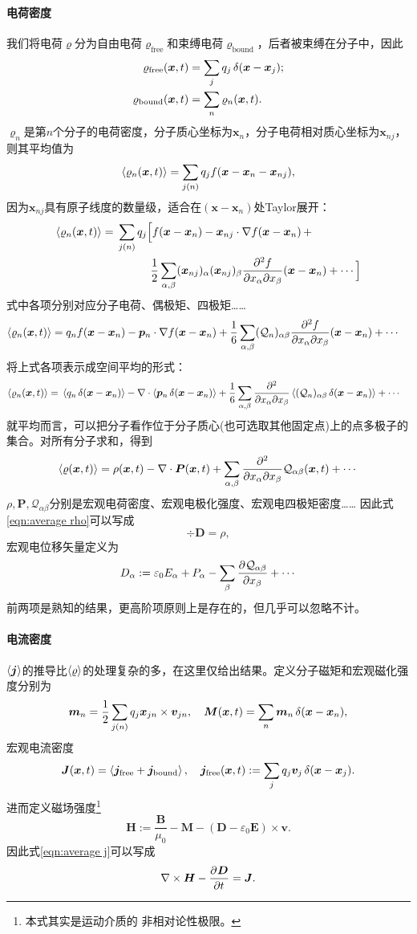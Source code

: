 \paragraph{电荷密度}
我们将电荷$\varrho$分为自由电荷$\varrho_\text{free}$和束缚电荷$\varrho_\text{bound}$，后者被束缚在分子中，因此
\begin{align*}
    \varrho_\text{free}(\bm x,t)&=\sum_jq_j\mathop{}\!\delta(\bm x-\bm x_j);\\
    \varrho_\text{bound}(\bm x,t)&=\sum_n\varrho_n(\bm x,t).
\end{align*}
$\varrho_n$是第$n$个分子的电荷密度，分子质心坐标为$\bm x_n$，分子电荷相对质心坐标为$\bm x_{nj}$，则其平均值为
\[
    \left\langle \varrho_n(\bm x,t)\right\rangle=\sum_{j(n)}q_jf(\bm x-\bm x_n-\bm x_{nj}),
\]
因为$\bm x_{nj}$具有原子线度的数量级，适合在$(\bm x-\bm x_n)$处Taylor展开： 
\begin{align*}
    \left\langle \varrho_n(\bm x,t)\right\rangle={}&\sum_{j(n)}q_j\Big[f(\bm x-\bm x_n)-\bm x_{nj}\cdot\nabla f(\bm x-\bm x_n)\,+\\
    &\qquad\quad\frac12\sum_{\alpha,\beta}(\bm x_{nj})_\alpha(\bm x_{nj})_\beta\frac{\partial^2{f}}{\partial{x_\alpha}\partial{x_\beta}}(\bm x-\bm x_n)+\cdots\Big]
\end{align*}
式中各项分别对应分子电荷、偶极矩、四极矩……
\begin{align*}
    \left\langle \varrho_n(\bm x,t)\right\rangle={}&q_nf(\bm x-\bm x_n)-\bm p_n\cdot\nabla f(\bm x-\bm x_n)+\frac16\sum_{\alpha,\beta}(\mathcal Q_n)_{\alpha\beta}\frac{\partial^2{f}}{\partial{x_\alpha}\partial{x_\beta}}(\bm x-\bm x_n)+\cdots
\end{align*}
将上式各项表示成空间平均的形式：
\begin{align*}
    \left\langle \varrho_n(\bm x,t)\right\rangle={}&\left\langle q_n\mathop{}\!\delta(\bm x-\bm x_n)\right\rangle-\nabla\cdot\left\langle \bm p_n\mathop{}\!\delta(\bm x-\bm x_n)\right\rangle+\frac16\sum_{\alpha,\beta}\frac{\partial^2{}}{\partial{x_\alpha}\partial{x_\beta}}\left\langle (\mathcal Q_n)_{\alpha\beta}\mathop{}\!\delta(\bm x-\bm x_n)\right\rangle+\cdots
\end{align*}
就平均而言，可以把分子看作位于分子质心(也可选取其他固定点)上的点多极子的集合。对所有分子求和，得到
\[
    \left\langle \varrho(\bm x,t)\right\rangle=\rho(\bm x,t)-\nabla\cdot\bm P(\bm x,t)+\sum_{\alpha,\beta}\frac{\partial^2{}}{\partial{x_\alpha}\partial{x_\beta}}\mathcal Q_{\alpha\beta}(\bm x,t)+\cdots
\]
$\rho,\bm P,\mathcal Q_{\alpha\beta}$分别是宏观电荷密度、宏观电极化强度、宏观电四极矩密度……
因此式\eqref{eqn:average rho}可以写成 
\[
    \div\bm D=\rho,
\]
宏观电位移矢量定义为
\[
    D_\alpha:=\varepsilon_0E_\alpha+P_\alpha-\sum_\beta\frac{\partial^{{}}\mathcal Q_{\alpha\beta}}{\partial{x_\beta}^{{}}}+\cdots
\]
前两项是熟知的结果，更高阶项原则上是存在的，但几乎可以忽略不计。
\paragraph{电流密度}
$\left\langle \bm j\right\rangle$的推导比$\left\langle \varrho\right\rangle$的处理复杂的多，在这里仅给出结果。定义分子磁矩和宏观磁化强度分别为
\[
    \bm m_n=\frac12\sum_{j(n)}q_j\bm x_{jn}\times\bm v_{jn},\quad\bm M(\bm x,t)=\sum_n\bm m_n\mathop{}\!\delta(\bm x-\bm x_n),
\]
宏观电流密度
\[
    \bm J(\bm x,t)=\left\langle \bm j_\text{free}+\bm j_\text{bound}\right\rangle,\quad\bm j_\text{free}(\bm x,t):=\sum_jq_j\bm v_j\mathop{}\!\delta(\bm x-\bm x_j).
\]
进而定义磁场强度\footnote{本式其实是运动介质的%
非相对论性极限。}
\[
    \bm H:=\frac{\bm B}{\mu_0}-\bm M-(\bm D-\varepsilon_0\bm E)\times\bm v.
\]
因此式\eqref{eqn:average j}可以写成
\[
    \nabla\times\bm H-\frac{\partial^{{}}\bm D}{\partial{t}^{{}}}=\bm J.
\] 

